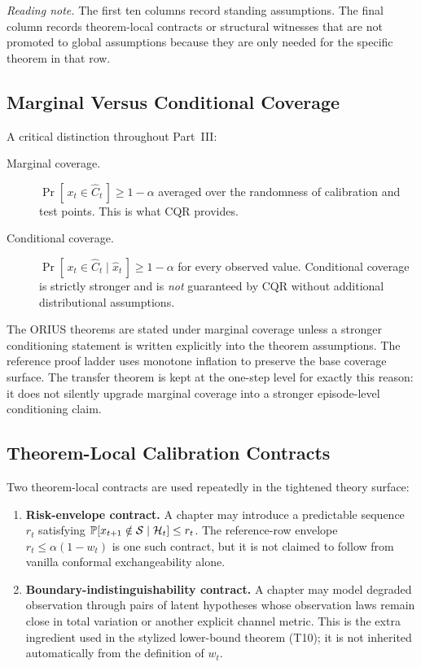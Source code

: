 \noindent\textit{Reading note.}  The first ten columns record standing
assumptions.  The final column records theorem-local contracts or structural
witnesses that are not promoted to global assumptions because they are only
needed for the specific theorem in that row.

\subsection{Marginal Versus Conditional Coverage}

A critical distinction throughout Part~III:
\begin{description}
  \item[Marginal coverage.] $\Pr[\,x_t \in \hat{C}_t\,] \ge 1 - \alpha$
    averaged over the randomness of calibration and test points.
    This is what CQR provides.
  \item[Conditional coverage.] $\Pr[\,x_t \in \hat{C}_t \mid \hat{x}_t\,]
    \ge 1 - \alpha$ for every observed value.  Conditional coverage is
    strictly stronger and is \emph{not} guaranteed by CQR without
    additional distributional assumptions.
\end{description}

The ORIUS theorems are stated under marginal coverage unless a stronger
conditioning statement is written explicitly into the theorem assumptions.
The reference proof ladder uses monotone inflation to preserve the base
coverage surface.  The transfer theorem is kept at the one-step level for
exactly this reason: it does not silently upgrade marginal coverage into a
stronger episode-level conditioning claim.

\subsection{Theorem-Local Calibration Contracts}

Two theorem-local contracts are used repeatedly in the tightened theory
surface:
\begin{enumerate}
  \item \textbf{Risk-envelope contract.}  A chapter may introduce a
    predictable sequence $r_t$ satisfying
    $\operatorname{\mathbb{P}}[x_{t+1}\notin\mathcal{S}\mid \mathcal{H}_t] \le r_t$.
    The reference-row envelope $r_t \le \alpha(1-w_t)$ is one such
    contract, but it is not claimed to follow from vanilla conformal
    exchangeability alone.
  \item \textbf{Boundary-indistinguishability contract.}  A chapter may
    model degraded observation through pairs of latent hypotheses whose
    observation laws remain close in total variation or another explicit
    channel metric.  This is the extra ingredient used in the stylized
    lower-bound theorem (T10); it is not inherited automatically from the
    definition of $w_t$.
\end{enumerate}

